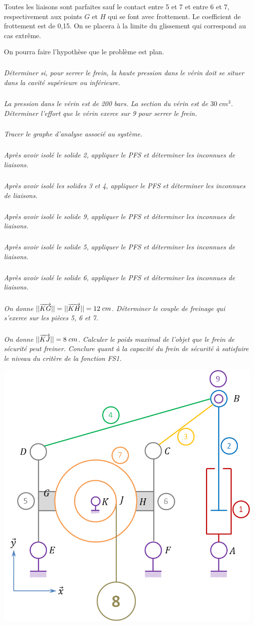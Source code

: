 \documentclass[10pt]{article}
\begin{document}
Toutes les liaisons sont parfaites sauf le contact entre 5 et 7 et entre 6 et 7, respectivement aux points $G$ et $H$ qui se font avec frottement. Le coefficient de frottement est de 0,15. On se placera à la limite du glissement qui correspond au cas extrême.

On pourra faire l'hypothèse que le problème est plan.

\subparagraph{}
\textit{Déterminer si, pour serrer le frein, la haute pression dans le vérin doit se situer dans la cavité supérieure ou inférieure.}

\subparagraph{}
\textit{La pression dans le vérin est de 200 bars. La section du vérin est de $30\; cm^3$. Déterminer l'effort que le vérin exerce sur 9 pour serrer le frein.}

\subparagraph{}
\textit{Tracer le graphe d'analyse associé au système.}

\subparagraph{}
\textit{Après avoir isolé le solide 2, appliquer le PFS et déterminer les inconnues de liaisons.}

\subparagraph{}
\textit{Après avoir isolé les solides 3 et 4, appliquer le PFS et déterminer les inconnues de liaisons.}

\subparagraph{}
\textit{Après avoir isolé le solide 9, appliquer le PFS et déterminer les inconnues de liaisons.}

\subparagraph{}
\textit{Après avoir isolé le solide 5, appliquer le PFS et déterminer les inconnues de liaisons.}

\subparagraph{}
\textit{Après avoir isolé le solide 6, appliquer le PFS et déterminer les inconnues de liaisons.}

\subparagraph{}
\textit{On donne $||\overrightarrow{KG}||=||\overrightarrow{KH}||=12\;cm$. Déterminer le couple de freinage qui s'exerce sur les pièces 5, 6 et 7. }

\subparagraph{}
\textit{On donne $||\overrightarrow{KJ}||=8\;cm$. Calculer le poids maximal de l'objet que le frein de sécurité peut freiner. Conclure quant à la capacité du frein de sécurité à satisfaire le niveau du critère de la fonction FS1.}


\begin{center}
\includegraphics[width=.55\textwidth]{images/grue2}
\end{center}
\end{document}
